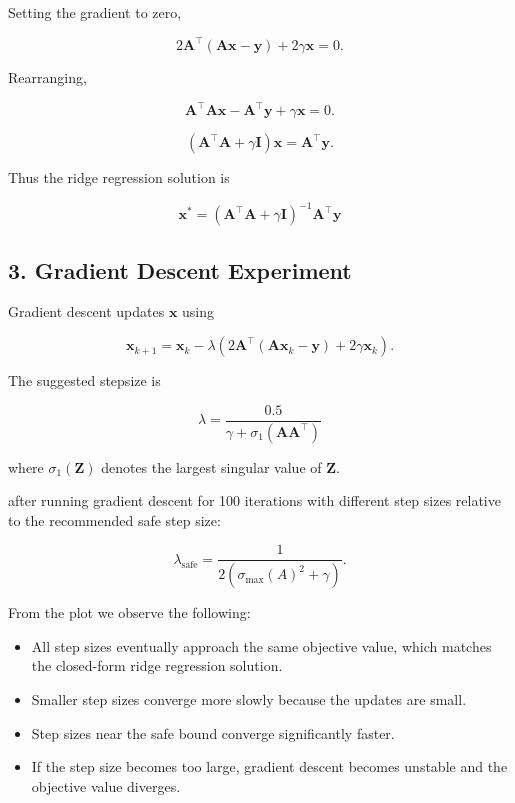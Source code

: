 \documentclass[11pt]{article}
\begin{document}
Setting the gradient to zero,

\[
2\mathbf{A}^\top(\mathbf{A}\mathbf{x}-\mathbf{y}) + 2\gamma \mathbf{x} = 0.
\]

Rearranging,

\[
\mathbf{A}^\top \mathbf{A}\mathbf{x} - \mathbf{A}^\top \mathbf{y} + \gamma \mathbf{x} = 0.
\]

\[
(\mathbf{A}^\top \mathbf{A} + \gamma \mathbf{I})\mathbf{x} = \mathbf{A}^\top \mathbf{y}.
\]

Thus the ridge regression solution is

\[
\boxed{
\mathbf{x}^* =
(\mathbf{A}^\top \mathbf{A} + \gamma \mathbf{I})^{-1}
\mathbf{A}^\top \mathbf{y}
}
\]

\subsection*{3. Gradient Descent Experiment}

Gradient descent updates $\mathbf{x}$ using

\[
\mathbf{x}_{k+1}
=
\mathbf{x}_k
-
\lambda
\left(
2\mathbf{A}^\top(\mathbf{A}\mathbf{x}_k-\mathbf{y})
+
2\gamma \mathbf{x}_k
\right).
\]

The suggested stepsize is

\[
\lambda =
\frac{0.5}{\gamma + \sigma_1(\mathbf{A}\mathbf{A}^\top)}
\]

where $\sigma_1(\mathbf{Z})$ denotes the largest singular value of $\mathbf{Z}$.


after running gradient descent for 100 iterations with different step sizes relative to the recommended safe step size:

\[
\lambda_{\text{safe}} = \frac{1}{2(\sigma_{\max}(A)^2 + \gamma)}.
\]

From the plot we observe the following:

\begin{itemize}

\item All step sizes eventually approach the same objective value, which matches the closed-form ridge regression solution.

\item Smaller step sizes converge more slowly because the updates are small.

\item Step sizes near the safe bound converge significantly faster.

\item If the step size becomes too large, gradient descent becomes unstable and the objective value diverges.

\end{itemize}
\end{document}
